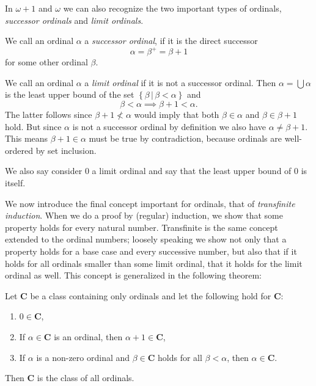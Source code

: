 \documentclass[../../main.tex]{subfiles}
\begin{document}
In $\omega + 1$ and $\omega$ we can also recognize the two important types of ordinals, \textit{successor ordinals} and \textit{limit ordinals}.

\begin{definition}\cite[p.13]{Jec78}
    We call an ordinal $\alpha$ a \textit{successor ordinal}, if it is the direct successor $$\alpha = \beta^+ = \beta + 1$$
    for some other ordinal $\beta$.
\end{definition}

\begin{definition}\cite[Exercise 2.3]{Jec78}
    We call an ordinal $\alpha$ a \textit{limit ordinal} if it is not a successor ordinal.
    Then $\alpha = \bigcup \alpha$ is the least upper bound of the set $\left\{\beta \,\vert\, \beta < \alpha\right\}$ and $$\beta < \alpha \implies \beta + 1 < \alpha.$$
    The latter follows since $\beta + 1 \not< \alpha$ would imply that both $\beta \in \alpha$ and $\beta \in \beta + 1$ hold.
    But since $\alpha$ is not a successor ordinal by definition we also have $\alpha \neq \beta + 1$.
    This means $\beta + 1 \in \alpha$ must be true by contradiction, because ordinals are well-ordered by set inclusion.

    We also say consider $0$ a limit ordinal and say that the least upper bound of $0$ is itself.
\end{definition}

We now introduce the final concept important for ordinals, that of \textit{transfinite induction}.
When we do a proof by (regular) induction, we show that some property holds for every natural number.
Transfinite is the same concept extended to the ordinal numbers; loosely speaking we show not only that a property holds for a base case and every successive number,
but also that if it holds for all ordinals smaller than some limit ordinal, that it holds for the limit ordinal as well.
This concept is generalized in the following theorem:

\begin{theorem}\cite[Theorem 3]{Jec78}
    Let $\mathbf{C}$ be a class containing only ordinals and let the following hold for $\mathbf{C}$:
    \begin{enumerate}[label=(\roman*)]
        \item $0 \in \mathbf{C}$,
        \item If $\alpha \in \mathbf{C}$ is an ordinal, then $\alpha + 1 \in \mathbf{C}$,
        \item If $\alpha$ is a non-zero ordinal and $\beta \in \mathbf{C}$ holds for all $\beta < \alpha$, then $\alpha \in \mathbf{C}$.
    \end{enumerate}
    Then $\mathbf{C}$ is the class of all ordinals.
\end{theorem}
\end{document}
